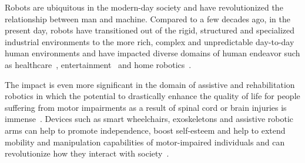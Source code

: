 \documentclass[12pt]{article}
\begin{document}
Robots are ubiquitous in the modern-day society and have revolutionized the relationship between man and machine. Compared to a few decades ago, in the present day, robots have transitioned out of the rigid, structured and specialized industrial environments to the more rich, complex and unpredictable day-to-day human environments and have impacted diverse domains of human endeavor such as healthcare~\cite{laplante1992assistive}, entertainment~\cite{gopinath2016generative} and home robotics~\cite{fischinger2016hobbit}.


The impact is even more significant in the domain of assistive and rehabilitation robotics in which the potential to drastically enhance the quality of life for people suffering from motor impairments as a result of spinal cord or brain injuries is immense~\cite{muelling2017autonomy}. Devices such as smart wheelchairs, exoskeletons and assistive robotic arms can help to promote independence, boost self-esteem and help to extend mobility and manipulation capabilities of motor-impaired individuals and can revolutionize how they interact with society~\cite{mataric2007socially}.
\end{document}
